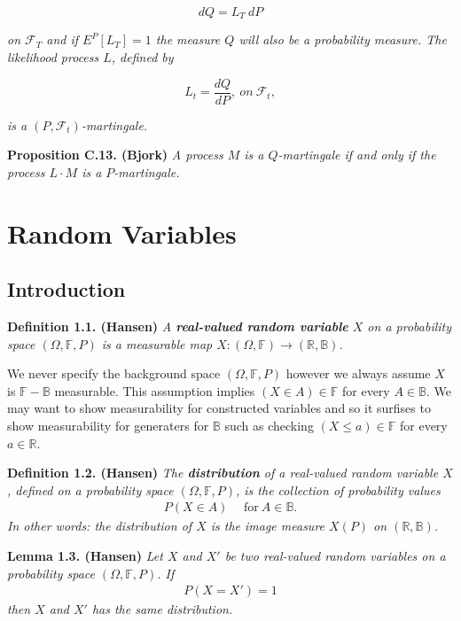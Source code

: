 \documentclass[
]{book}
\begin{document}
\[
dQ=L_T\ dP
\]

\emph{on \(\mathcal{F}_T\) and if \(E^P[L_T]=1\) the measure \(Q\) will also be a probability measure. The likelihood process \(L\), defined by}

\[
L_t=\frac{dQ}{dP},\ on\ \mathcal{F}_t,\tag{C.8}
\]

\emph{is a \((P,\mathcal{F}_t)\)-martingale.}

\textbf{Proposition C.13. (Bjork)} \emph{A process \(M\) is a \(Q\)-martingale if and only if the process \(L\cdot M\) is a \(P\)-martingale.}

\hypertarget{random-variables-1}{%
\chapter{Random Variables}\label{random-variables-1}}

\hypertarget{introduction-1}{%
\section{Introduction}\label{introduction-1}}

\textbf{Definition 1.1. (Hansen)} \emph{A \textbf{real-valued random variable} \(X\) on a probability space \((\Omega, \mathbb{F},P)\) is a measurable map \(X : (\Omega,\mathbb{F})\to (\mathbb{R},\mathbb{B})\).}

We never specify the background space \((\Omega, \mathbb{F},P)\) however we always assume \(X\) is \(\mathbb{F}-\mathbb{B}\) measurable. This assumption implies \((X\in A)\in \mathbb{F}\) for every \(A\in \mathbb{B}\). We may want to show measurability for constructed variables and so it surfises to show measurability for generaters for \(\mathbb{B}\) such as checking \((X\le a)\in\mathbb{F}\) for every \(a\in\mathbb{R}\).

\textbf{Definition 1.2. (Hansen)} \emph{The \textbf{distribution} of a real-valued random variable \(X\), defined on a probability space \((\Omega,\mathbb{F},P)\), is the collection of probability values}
\begin{align*}
    P(X\in A)\hspace{15pt}\text{for}\ A\in \mathbb{B}.\tag{1.3}
\end{align*}
\emph{In other words: the distribution of \(X\) is the image measure \(X(P)\) on \((\mathbb{R},\mathbb{B})\).}

\textbf{Lemma 1.3. (Hansen)} \emph{Let \(X\) and \(X'\) be two real-valued random variables on a probability space \((\Omega,\mathbb{F},P)\). If}
\begin{align*}
    P(X=X')=1
\end{align*}
\emph{then \(X\) and \(X'\) has the same distribution.}
\end{document}
